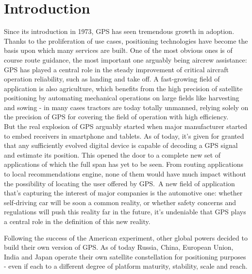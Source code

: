 \chapter{Introduction}
\label{introduction}


Since its introduction in 1973, GPS has seen tremendous growth in adoption.
Thanks to the proliferation of use cases, positioning technologies have become
the basis upon which many services are built. One of the most obvious ones is of
course route guidance, the most important one arguably being aircrew assistance:
GPS has played a central role in the steady improvement of critical aircraft
operation reliability, such as landing and take off. A fast-growing field of
application is also agriculture, which benefits from the high precision of
satellite positioning by automating mechanical operations on large fields like
harvesting and sowing - in many cases tractors are today totally unmanned,
relying solely on the precision of GPS for covering the field of operation with
high efficiency.\\
But the real explosion of GPS arguably started when major manufacturer started
to embed receivers in smartphone and tablets. As of today, it's given for
granted that any sufficiently evolved digital device is capable of decoding a
GPS signal and estimate its position. This opened the door to a complete new set
of applications of which the full span has yet to be seen. From routing
applications to local recommendations engine, none of them would have much
impact without the possibility of locating the user offered by GPS.\
A new field of application that's capturing the interest of major companies is
the automotive one: whether self-driving car will be soon a common reality, or
whether safety concerns and regulations will push this reality far in the
future, it's undeniable that GPS plays a central role in the definition of this
new reality.

Following the success of the American experiment, other global powers decided to
build their own version of GPS. As of today Russia, China, European Union, India
and Japan operate their own satellite constellation for positioning purposes -
even if each to a different degree of platform maturity, stability, scale and
reach.

